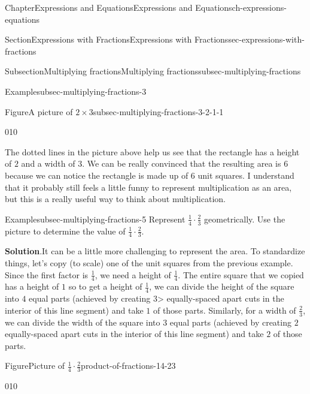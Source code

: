 \documentclass[twoside,11pt,]{book}
\newcommand{\blocktitlefont}{\relax}
\numberwithin{equation}{chapter}
\begin{document}
\begin{chapterptx}{Chapter}{Expressions and Equations}{}{Expressions and Equations}{}{}{ch-expressions-equations}
\begin{sectionptx}{Section}{Expressions with Fractions}{}{Expressions with Fractions}{}{}{sec-expressions-with-fractions}
\begin{subsectionptx}{Subsection}{Multiplying fractions}{}{Multiplying fractions}{}{}{subsec-multiplying-fractions}
\begin{example}{Example}{}{subsec-multiplying-fractions-3}
\begin{figureptx}{Figure}{A picture of \(2 \times 3\)}{subsec-multiplying-fractions-3-2-1-1}{}
\begin{image}{0}{1}{0}{}
{%
}%
\end{image}%
\tcblower
\end{figureptx}%
%
\end{example}
The dotted lines in the picture above help us see that the rectangle has a height of \(2\) and a width of \(3\). We can be really convinced that the resulting area is \(6\) because we can notice the rectangle is made up of \(6\) unit squares. I understand that it probably still feels a little funny to represent multiplication as an area, but this is a really useful way to think about multiplication.%
\begin{example}{Example}{}{subsec-multiplying-fractions-5}%
Represent \(\frac14 \cdot \frac23\) geometrically. Use the picture to determine the value of \(\frac14 \cdot \frac23\).%
\par\smallskip%
\noindent\textbf{\blocktitlefont Solution}.\hypertarget{subsec-multiplying-fractions-5-2}{}\quad{}It can be a little more challenging to represent the area. To standardize things, let's copy (to scale) one of the unit squares from the previous example. Since the first factor is \(\frac14\), we need a height of \(\frac14\). The entire square that we copied has a height of \(1\) so to get a height of \(\frac14\), we can divide the height of the square into \(4\) equal parts (achieved by creating \(3\)\textgreater{} equally-spaced apart cuts in the interior of this line segment) and take \(1\) of those parts. Similarly, for a width of \(\frac23\), we can divide the width of the square into \(3\) equal parts (achieved by creating \(2\) equally-spaced apart cuts in the interior of this line segment) and take \(2\) of those parts. \begin{figureptx}{Figure}{Picture of \(\frac14 \cdot \frac23\)}{product-of-fractions-14-23}{}%
\begin{image}{0}{1}{0}{}%
\end{image}
\end{figureptx}
\end{example}
\end{subsectionptx}
\end{sectionptx}
\end{chapterptx}
\end{document}
